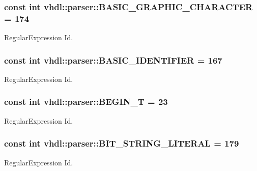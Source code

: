 \subsubsection[{B\+A\+S\+I\+C\+\_\+\+G\+R\+A\+P\+H\+I\+C\+\_\+\+C\+H\+A\+R\+A\+C\+T\+E\+R}]{\setlength{\rightskip}{0pt plus 5cm}const int vhdl\+::parser\+::\+B\+A\+S\+I\+C\+\_\+\+G\+R\+A\+P\+H\+I\+C\+\_\+\+C\+H\+A\+R\+A\+C\+T\+E\+R = 174}\label{namespacevhdl_1_1parser_a1b0e3bb38d7b382936540916096220b0}
Regular\+Expression Id. \hypertarget{namespacevhdl_1_1parser_ab443fb1381fc7a5ad74af59af14f99d2}{}
\subsubsection[{B\+A\+S\+I\+C\+\_\+\+I\+D\+E\+N\+T\+I\+F\+I\+E\+R}]{\setlength{\rightskip}{0pt plus 5cm}const int vhdl\+::parser\+::\+B\+A\+S\+I\+C\+\_\+\+I\+D\+E\+N\+T\+I\+F\+I\+E\+R = 167}\label{namespacevhdl_1_1parser_ab443fb1381fc7a5ad74af59af14f99d2}
Regular\+Expression Id. \hypertarget{namespacevhdl_1_1parser_a4ea9f25f232e6f6610a0fb064cbf6d2e}{}
\subsubsection[{B\+E\+G\+I\+N\+\_\+\+T}]{\setlength{\rightskip}{0pt plus 5cm}const int vhdl\+::parser\+::\+B\+E\+G\+I\+N\+\_\+\+T = 23}\label{namespacevhdl_1_1parser_a4ea9f25f232e6f6610a0fb064cbf6d2e}
Regular\+Expression Id. \hypertarget{namespacevhdl_1_1parser_a630fb281032e8158361e7988987b2404}{}
\subsubsection[{B\+I\+T\+\_\+\+S\+T\+R\+I\+N\+G\+\_\+\+L\+I\+T\+E\+R\+A\+L}]{\setlength{\rightskip}{0pt plus 5cm}const int vhdl\+::parser\+::\+B\+I\+T\+\_\+\+S\+T\+R\+I\+N\+G\+\_\+\+L\+I\+T\+E\+R\+A\+L = 179}\label{namespacevhdl_1_1parser_a630fb281032e8158361e7988987b2404}
Regular\+Expression Id. \hypertarget{namespacevhdl_1_1parser_a1e845b0d4903c59d5b8e996a5d03cd2a}{}
